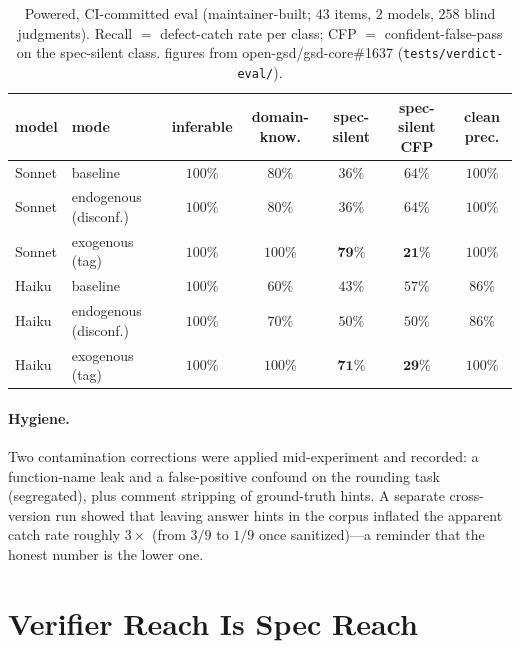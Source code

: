 \documentclass[11pt]{article}
\newcommand{\code}[1]{\texttt{#1}}
\begin{document}
\begin{table}[h]
\centering
\caption{Powered, CI-committed eval (maintainer-built; $43$ items, $2$ models, $258$ blind judgments).
Recall $=$ defect-catch rate per class; CFP $=$ confident-false-pass on the spec-silent class.
figures from open-gsd/gsd-core\#1637 (\code{tests/verdict-eval/}).}
\label{tab:t5}
\small\setlength{\tabcolsep}{4pt}%
\begin{tabular}{llccccc}
\toprule
model & mode & inferable & domain-know. & spec-silent & spec-silent CFP & clean prec. \\
\midrule
Sonnet & baseline             & $100\%$ & $80\%$  & $36\%$          & $64\%$          & $100\%$ \\
Sonnet & endogenous (disconf.)& $100\%$ & $80\%$  & $36\%$          & $64\%$          & $100\%$ \\
Sonnet & exogenous (tag)      & $100\%$ & $100\%$ & $\mathbf{79\%}$ & $\mathbf{21\%}$ & $100\%$ \\
Haiku  & baseline             & $100\%$ & $60\%$  & $43\%$          & $57\%$          & $86\%$  \\
Haiku  & endogenous (disconf.)& $100\%$ & $70\%$  & $50\%$          & $50\%$          & $86\%$  \\
Haiku  & exogenous (tag)      & $100\%$ & $100\%$ & $\mathbf{71\%}$ & $\mathbf{29\%}$ & $100\%$ \\
\bottomrule
\end{tabular}
\end{table}

\paragraph{Hygiene.} Two contamination corrections were applied mid-experiment and recorded: a
function-name leak and a false-positive confound on the rounding task (segregated), plus comment
stripping of ground-truth hints. A separate cross-version run showed that leaving answer hints in the
corpus inflated the apparent catch rate roughly $3\times$ (from $3/9$ to $1/9$ once sanitized)---a
reminder that the honest number is the lower one.

\section{Verifier Reach Is Spec Reach}
\label{sec:reach}
\end{document}
